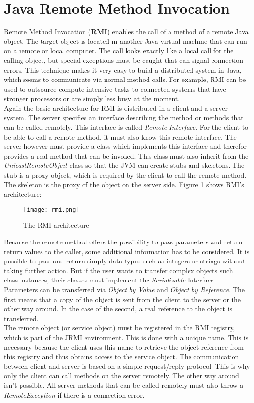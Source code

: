 \section{Java Remote Method Invocation}
Remote Method Invocation (\textbf{RMI}) enables the call of a method of a remote Java object. The target object is located in another Java virtual machine that can run on a remote or local computer. The call looks exactly like a local call for the calling object, but special exceptions must be caught that can signal connection errors. This technique makes it very easy to build a distributed system in Java, which seems to communicate via normal method calls. For example, RMI can be used to outsource compute-intensive tasks to connected systems that have stronger processors or are simply less busy at the moment. 
\\
Again the basic architecture for RMI is distributed in a client and a server system. The server specifies an interface describing the method or methods that can be called remotely. This interface is called \textit{Remote Interface}. For the client to be able to call a remote method, it must also know this remote interface. The server however must provide a class which implements this interface and therefor provides a real method that can be invoked. This class must also inherit from the \textit{UnicastRemoteObject} class so that the JVM can create stubs and skeletons. The stub is a proxy object, which is required by the client to call the remote method. The skeleton is the proxy of the object on the server side. Figure \ref{rmi} shows RMI's architecture:
\begin{figure}[H]
	\centering
	\texttt{[image: rmi.png]}
	\caption[Caption for LOF]{The RMI architecture\footnotemark}
	\label{rmi}
\end{figure}
Because the remote method offers the possibility to pass parameters and return return values to the caller, some additional information has to be considered. It is possible to pass and return simply data types such as integers or strings without taking further action. But if the user wants to transfer complex objects such class-instances, their classes must implement the \textit{Serializable}-Interface.
\\
Parameters can be transferred via \textit{Object by Value} and \textit{Object by Reference}. The first means that a copy of the object is sent from the client to the server or the other way around. In the case of the second, a real reference to the object is transferred.
\\
The remote object (or service object) must be registered in the RMI registry, which is part of the JRMI environment. This is done with a unique name. This is necessary because the client uses this name to retrieve the object reference from this registry and thus obtains access to the service object. The communication between client and server is based on a simple request/reply protocol. This is why only the client can call methods on the server remotely. The other way around isn't possible. All server-methods that can be called remotely must also throw a \textit{RemoteException} if there is a connection error.

